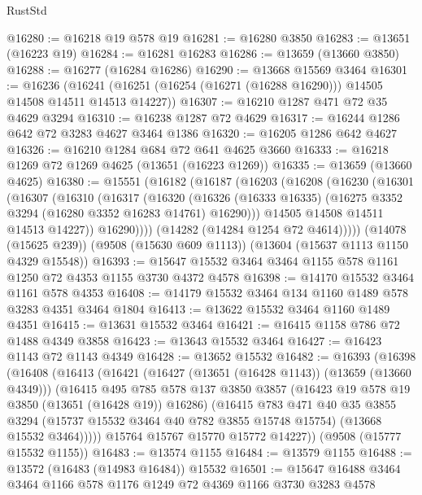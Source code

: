 \begin{lexlean}{RustStd}
\begin{coremodule}
@16280 := @16218 @19 @578 @19
@16281 := @16280 @3850
@16283 := @13651 (@16223 @19)
@16284 := @16281 @16283
@16286 := @13659 (@13660 @3850)
@16288 := @16277 (@16284 @16286)
@16290 := @13668 @15569 @3464
@16301 := @16236
    (@16241 (@16251 (@16254 (@16271 (@16288 @16290))) @14505 @14508 @14511 @14513 @14227))
@16307 := @16210 @1287 @471 @72 @35 @4629 @3294
@16310 := @16238 @1287 @72 @4629
@16317 := @16244 @1286 @642 @72 @3283 @4627 @3464 @1386
@16320 := @16205 @1286 @642 @4627
@16326 := @16210 @1284 @684 @72 @641 @4625 @3660
@16333 := @16218 @1269 @72 @1269 @4625 (@13651 (@16223 @1269))
@16335 := @13659 (@13660 @4625)
@16380 := @15551
    (@16182
      (@16187
        (@16203
          (@16208
            (@16230
              (@16301
                (@16307
                  (@16310
                    (@16317
                      (@16320
                        (@16326
                          (@16333 @16335)
                          (@16275 @3352 @3294 (@16280 @3352 @16283 @14761) @16290)))
                      @14505
                      @14508
                      @14511
                      @14513
                      @14227))
                  @16290))))
          (@14282 (@14284 @1254 @72 @4614)))))
    (@14078 (@15625 @239))
    (@9508 (@15630 @609 @1113))
    (@13604 (@15637 @1113 @1150 @4329 @15548))
@16393 := @15647 @15532 @3464 @3464 @1155 @578 @1161 @1250 @72 @4353 @1155 @3730 @4372 @4578
@16398 := @14170 @15532 @3464 @1161 @578 @4353
@16408 := @14179 @15532 @3464 @134 @1160 @1489 @578 @3283 @4351 @3464 @1804
@16413 := @13622 @15532 @3464 @1160 @1489 @4351
@16415 := @13631 @15532 @3464
@16421 := @16415 @1158 @786 @72 @1488 @4349 @3858
@16423 := @13643 @15532 @3464
@16427 := @16423 @1143 @72 @1143 @4349
@16428 := @13652 @15532
@16482 := @16393
    (@16398
      (@16408
        (@16413
          (@16421
            (@16427 (@13651 (@16428 @1143)) (@13659 (@13660 @4349)))
            (@16415
              @495
              @785
              @578
              @137
              @3850
              @3857
              (@16423 @19 @578 @19 @3850 (@13651 (@16428 @19)) @16286)
              (@16415
                @783
                @471
                @40
                @35
                @3855
                @3294
                (@15737 @15532 @3464 @40 @782 @3855 @15748 @15754)
                (@13668 @15532 @3464)))))
        @15764
        @15767
        @15770
        @15772
        @14227))
    (@9508 (@15777 @15532 @1155))
@16483 := @13574 @1155
@16484 := @13579 @1155
@16488 := @13572 (@16483 (@14983 @16484)) @15532
@16501 := @15647 @16488 @3464 @3464 @1166 @578 @1176 @1249 @72 @4369 @1166 @3730 @3283 @4578

\end{coremodule}
\end{lexlean}
